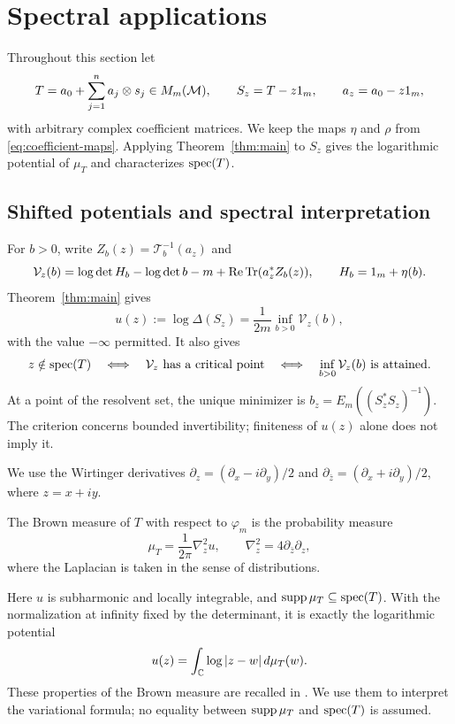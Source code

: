 \section{Spectral applications}\label{sec:spectral}

Throughout this section let
\[
 T=a_0+\sum_{j=1}^n a_j\otimes s_j\in M_m(\mathcal M),\qquad
 S_z=T-z1_m,\qquad a_z=a_0-z1_m,
\]
with arbitrary complex coefficient matrices.
We keep the maps $\eta$ and $\rho$ from \eqref{eq:coefficient-maps}.
Applying Theorem~\ref{thm:main} to $S_z$ gives the logarithmic potential of $\mu_T$ and characterizes $\operatorname{spec}(T)$.

\subsection{Shifted potentials and spectral interpretation}
For $b>0$, write $Z_b(z)=\mathcal T_b^{-1}(a_z)$ and
\[
 \mathcal V_z(b)=\log\det H_b-\log\det b-m
                   +\operatorname{Re}\operatorname{Tr}(a_z^*Z_b(z)),
 \qquad H_b=1_m+\eta(b).
\]
Theorem~\ref{thm:main} gives
\begin{equation}\label{eq:shifted-potential}
 u(z):=\log\Delta(S_z)=\frac1{2m}\inf_{b>0}\mathcal V_z(b),
\end{equation}
with the value $-\infty$ permitted.
It also gives
\begin{equation}\label{eq:full-spectrum}
 z\notin\operatorname{spec}(T)
 \quad\Longleftrightarrow\quad
 \mathcal V_z\text{ has a critical point}
 \quad\Longleftrightarrow\quad
 \inf_{b>0}\mathcal V_z(b)\text{ is attained}.
\end{equation}
At a point of the resolvent set, the unique minimizer is $b_z=E_m((S_z^*S_z)^{-1})$.
The criterion concerns bounded invertibility; finiteness of $u(z)$ alone does not imply it.

We use the Wirtinger derivatives $\partial_z=(\partial_x-i\partial_y)/2$ and $\partial_{\bar z}=(\partial_x+i\partial_y)/2$, where $z=x+iy$.
\begin{definition}\label{def:brown}\label{def:brown-measure}
The Brown measure of $T$ with respect to $\varphi_m$ is the probability measure
\begin{equation}\label{eq:brown-definition}
 \mu_T=\frac1{2\pi}\nabla_z^2u,\qquad
 \nabla_z^2=4\partial_{\bar z}\partial_z,
\end{equation}
where the Laplacian is taken in the sense of distributions.
\end{definition}
Here $u$ is subharmonic and locally integrable, and $\operatorname{supp}\mu_T\subseteq\operatorname{spec}(T)$.
With the normalization at infinity fixed by the determinant, it is exactly the logarithmic potential
\begin{equation}\label{eq:brown-logarithmic-potential}
 u(z)=\int_{\mathbb C}\log|z-w|\,d\mu_T(w).
\end{equation}
These properties of the Brown measure are recalled in \cite[Chapter 11, Theorem 5, Definition 6 and (11.6)--(11.8)]{MS17}.
We use them to interpret the variational formula; no equality between $\operatorname{supp}\mu_T$ and $\operatorname{spec}(T)$ is assumed.


